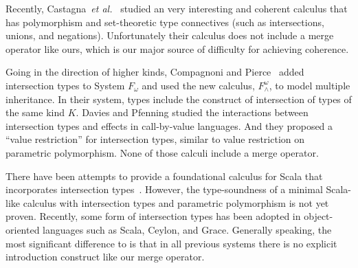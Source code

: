 Recently, Castagna~\textit{et al.}~\cite{Castagna:2014} studied an very interesting
and coherent calculus that has polymorphism and set-theoretic type connectives (such as
intersections, unions, and negations). Unfortunately their calculus
does not include a merge operator like ours, which is our major source
of difficulty for achieving coherence.

Going in the direction of higher
kinds, Compagnoni and Pierce~\cite{compagnoni1996higher} added
intersection types to System $ F_{\omega} $ and used the new calculus,
$ F^{\omega}_{\wedge} $, to model multiple inheritance. In their
system, types include the construct of intersection of types of the
same kind $ K $. Davies and Pfenning
\cite{davies2000intersection} studied the interactions between
intersection types and effects in call-by-value languages. And they
proposed a ``value restriction'' for intersection types, similar to
value restriction on parametric polymorphism. None of those calculi
include a merge operator.

There have been attempts to provide a foundational calculus
for Scala that incorporates intersection
types~\cite{amin2014foundations,amin2012dependent}.
However, the type-soundness of a minimal Scala-like
calculus with intersection types and parametric polymorphism is not
yet proven. Recently, some form of intersection
types has been adopted in object-oriented languages such as Scala,
Ceylon, and Grace. Generally speaking,
the most significant difference to \name is that in all previous systems
there is no explicit introduction construct like our merge operator.

\begin{comment}
only allow intersections of concrete types (classes),
whereas our language allows intersections of type variables, such as
\texttt{A \& B}. Without that vehicle, we would not be able to define
the generic \texttt{merge} function (below) for all interpretations of
a given algebra, and would incur boilerplate code:

\begin{lstlisting}
let merge [A, B] (f: ExpAlg A) (g: ExpAlg B) = {
  lit (x : Int) = f.lit x ,, g.lit x,
  add (x : A & B) (y : A & B) =
    f.add x y ,, g.add x y
}
\end{lstlisting}
\end{comment}

